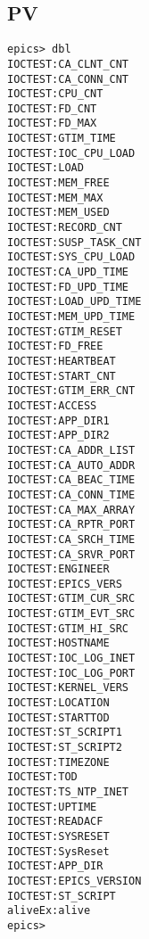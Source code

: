 \documentclass[11pt
  , a4paper
  , article
  , oneside
]{memoir}
\begin{document}
\subsection{PV}
\begin{lstlisting}[style=termstyle]
epics> dbl
IOCTEST:CA_CLNT_CNT
IOCTEST:CA_CONN_CNT
IOCTEST:CPU_CNT
IOCTEST:FD_CNT
IOCTEST:FD_MAX
IOCTEST:GTIM_TIME
IOCTEST:IOC_CPU_LOAD
IOCTEST:LOAD
IOCTEST:MEM_FREE
IOCTEST:MEM_MAX
IOCTEST:MEM_USED
IOCTEST:RECORD_CNT
IOCTEST:SUSP_TASK_CNT
IOCTEST:SYS_CPU_LOAD
IOCTEST:CA_UPD_TIME
IOCTEST:FD_UPD_TIME
IOCTEST:LOAD_UPD_TIME
IOCTEST:MEM_UPD_TIME
IOCTEST:GTIM_RESET
IOCTEST:FD_FREE
IOCTEST:HEARTBEAT
IOCTEST:START_CNT
IOCTEST:GTIM_ERR_CNT
IOCTEST:ACCESS
IOCTEST:APP_DIR1
IOCTEST:APP_DIR2
IOCTEST:CA_ADDR_LIST
IOCTEST:CA_AUTO_ADDR
IOCTEST:CA_BEAC_TIME
IOCTEST:CA_CONN_TIME
IOCTEST:CA_MAX_ARRAY
IOCTEST:CA_RPTR_PORT
IOCTEST:CA_SRCH_TIME
IOCTEST:CA_SRVR_PORT
IOCTEST:ENGINEER
IOCTEST:EPICS_VERS
IOCTEST:GTIM_CUR_SRC
IOCTEST:GTIM_EVT_SRC
IOCTEST:GTIM_HI_SRC
IOCTEST:HOSTNAME
IOCTEST:IOC_LOG_INET
IOCTEST:IOC_LOG_PORT
IOCTEST:KERNEL_VERS
IOCTEST:LOCATION
IOCTEST:STARTTOD
IOCTEST:ST_SCRIPT1
IOCTEST:ST_SCRIPT2
IOCTEST:TIMEZONE
IOCTEST:TOD
IOCTEST:TS_NTP_INET
IOCTEST:UPTIME
IOCTEST:READACF
IOCTEST:SYSRESET
IOCTEST:SysReset
IOCTEST:APP_DIR
IOCTEST:EPICS_VERSION
IOCTEST:ST_SCRIPT
aliveEx:alive
epics> 
\end{lstlisting}
\end{document}
